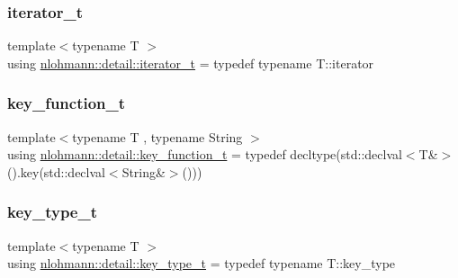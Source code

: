 \mbox{\label{namespacenlohmann_1_1detail_a9ff93db146174305bce1bc4c54703e11}} 
\subsubsection{\texorpdfstring{iterator\+\_\+t}{iterator\_t}}
{\footnotesize\ttfamily template$<$typename T $>$ \\
using \hyperlink{namespacenlohmann_1_1detail_a9ff93db146174305bce1bc4c54703e11}{nlohmann\+::detail\+::iterator\+\_\+t} = typedef typename T\+::iterator}

\mbox{\label{namespacenlohmann_1_1detail_a44869ca9f422b260625d78e4e8121559}} 
\subsubsection{\texorpdfstring{key\+\_\+function\+\_\+t}{key\_function\_t}}
{\footnotesize\ttfamily template$<$typename T , typename String $>$ \\
using \hyperlink{namespacenlohmann_1_1detail_a44869ca9f422b260625d78e4e8121559}{nlohmann\+::detail\+::key\+\_\+function\+\_\+t} = typedef decltype(std\+::declval$<$T\&$>$().key(std\+::declval$<$String\&$>$()))}

\mbox{\label{namespacenlohmann_1_1detail_a66dfe39f03b05d6b7265a0ff748d64ef}} 
\subsubsection{\texorpdfstring{key\+\_\+type\+\_\+t}{key\_type\_t}}
{\footnotesize\ttfamily template$<$typename T $>$ \\
using \hyperlink{namespacenlohmann_1_1detail_a66dfe39f03b05d6b7265a0ff748d64ef}{nlohmann\+::detail\+::key\+\_\+type\+\_\+t} = typedef typename T\+::key\+\_\+type}

